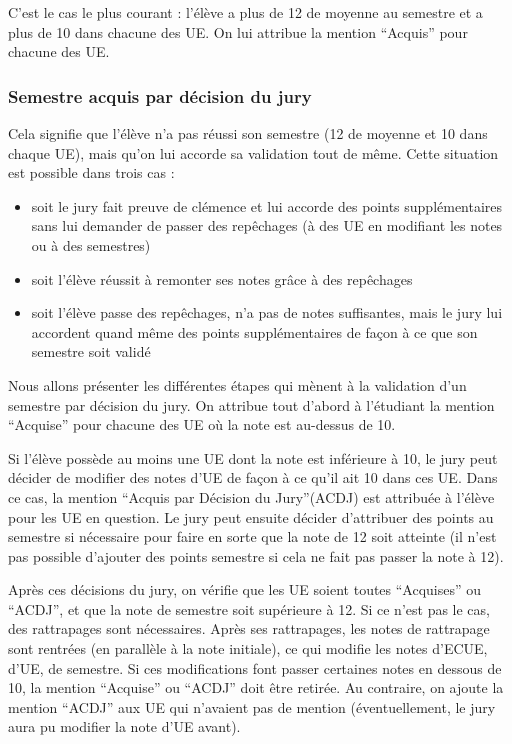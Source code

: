\documentclass[letter, 11pt] {article}
\begin{document}
		C’est le cas le plus courant : l’élève a plus de 12 de moyenne au semestre et a plus de 10 dans chacune des UE. On lui attribue la mention “Acquis” pour chacune des UE.

			\subsubsection*{Semestre acquis par décision du jury}

		Cela signifie que l’élève n’a pas réussi son semestre (12 de moyenne et 10 dans chaque UE), mais qu’on lui accorde sa validation tout de même. Cette situation est possible dans trois cas :
		\begin{itemize}
			\item{soit le jury fait preuve de clémence et lui accorde des points supplémentaires sans lui demander de passer des repêchages (à des UE en modifiant les notes ou à des semestres)}
			\item{soit l’élève réussit à remonter ses notes grâce à des repêchages}
			\item{soit l’élève passe des repêchages, n’a pas de notes suffisantes, mais le jury lui accordent   quand même des points supplémentaires de façon à ce que son semestre soit validé}
		\end{itemize}


		Nous allons présenter les différentes étapes qui mènent à la validation d’un semestre par décision du jury.
		On attribue tout d’abord à l’étudiant la mention “Acquise” pour chacune des UE où la note est au-dessus de 10.

		Si l’élève possède au moins une UE dont la note est inférieure à 10, le jury peut décider de modifier des notes d’UE de façon à ce qu’il ait 10 dans ces UE. Dans ce cas, la mention “Acquis par Décision du Jury”(ACDJ) est attribuée à l’élève pour les UE en question. Le jury peut ensuite décider d’attribuer des points au semestre si nécessaire pour faire en sorte que la note de 12 soit atteinte (il n’est pas possible d’ajouter des points semestre si cela ne fait pas passer la note à 12).

		Après ces décisions du jury, on vérifie que les UE soient toutes “Acquises” ou “ACDJ”, et que la note de semestre soit supérieure à 12. Si ce n’est pas le cas, des rattrapages sont nécessaires. Après ses rattrapages, les notes de rattrapage sont rentrées (en parallèle à la note initiale), ce qui modifie les notes d’ECUE, d’UE, de semestre. Si ces modifications font passer certaines notes en dessous de 10, la mention “Acquise” ou “ACDJ” doit être retirée. Au contraire, on ajoute la mention “ACDJ” aux UE qui n’avaient pas de mention (éventuellement, le jury aura pu modifier la note d’UE avant).
\end{document}
